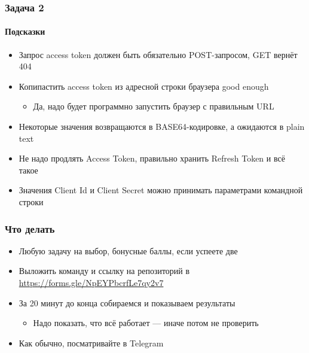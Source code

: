 \documentclass[xetex,mathserif,serif]{beamer}
\begin{document}
    \begin{frame}
        \frametitle{Задача 2}
        \framesubtitle{Подсказки}
        \begin{itemize}
            \item Запрос access token должен быть обязательно POST-запросом, GET вернёт 404
            \item Копипастить access token из адресной строки браузера good enough
            \begin{itemize}
                \item Да, надо будет программно запустить браузер с правильным URL
            \end{itemize}
            \item Некоторые значения возвращаются в BASE64-кодировке, а ожидаются в plain text
            \item Не надо продлять Access Token, правильно хранить Refresh Token и всё такое
            \item Значения Client Id и Client Secret можно принимать параметрами командной строки
        \end{itemize}
    \end{frame}

    \begin{frame}
        \frametitle{Что делать}
        \begin{itemize}
            \item Любую задачу на выбор, бонусные баллы, если успеете две
            \item Выложить команду и ссылку на репозиторий в \url{https://forms.gle/NpEYPbcrfLe7qy2v7}
            \item За 20 минут до конца собираемся и показываем результаты
            \begin{itemize}
                \item Надо показать, что всё работает --- иначе потом не проверить
            \end{itemize}
            \item Как обычно, посматривайте в Telegram
        \end{itemize}
    \end{frame}
\end{document}
